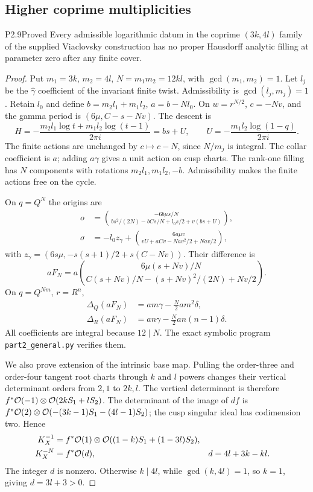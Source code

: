 \subsection{Higher coprime multiplicities}
\begin{statement}{P2.9}{Proved}
Every admissible logarithmic datum in the coprime $(3k,4l)$ family of the supplied Viaclovsky construction has no proper Hausdorff analytic filling at parameter zero after any finite cover.
\end{statement}
\begin{proof}
Put $m_1=3k$, $m_2=4l$, $N=m_1m_2=12kl$, with $\gcd(m_1,m_2)=1$. Let $l_j$ be the $\widehat\gamma$ coefficient of the invariant finite twist. Admissibility is $\gcd(l_j,m_j)=1$. Retain $l_0$ and define $b=m_2l_1+m_1l_2$, $a=b-Nl_0$. On $w=r^{N/2}$, $c=-Nv$, and the gamma period is $(6\mu,C-s-Nv)$. The descent is
\[
 H=-\frac{m_2l_1\log t+m_1l_2\log(t-1)}{2\pi i}=bs+U,
 \qquad U=-\frac{m_1l_2\log(1-q)}{2\pi i}.
\]
The finite actions are unchanged by $c\mapsto c-N$, since $N/m_j$ is integral. The collar coefficient is $a$; adding $a\gamma$ gives a unit action on cusp charts. The rank-one filling has $N$ components with rotations $m_2l_1,m_1l_2,-b$. Admissibility makes the finite actions free on the cycle.

On $q=Q^N$ the origins are
\begin{align*}
 o&=\binom{-6b\mu s/N}{bs^2/(2N)-bCs/N+l_0s/2+v(bs+U)},\\
 \sigma&=-l_0z_\gamma+\binom{6a\mu v}{vU+aCv-Nav^2/2+Nav/2},
\end{align*}
with $z_\gamma=(6s\mu,-s(s+1)/2+s(C-Nv))$. Their difference is
\[
 aF_N=a\binom{6\mu(s+Nv)/N}{C(s+Nv)/N-(s+Nv)^2/(2N)+Nv/2}.
\]
On $q=Q^{Nm}$, $r=R^n$,
\begin{align*}
 \Delta_Q(aF_N)&=am\gamma-\tfrac N2am^2\delta,\\
 \Delta_R(aF_N)&=an\gamma-\tfrac N2an(n-1)\delta.
\end{align*}
All coefficients are integral because $12\mid N$. The exact symbolic program \texttt{part2\_general.py} verifies them.

We also prove extension of the intrinsic base map. Pulling the order-three and order-four tangent root charts through $k$ and $l$ powers changes their vertical determinant orders from $2,1$ to $2k,l$. The vertical determinant is therefore $f^*\mathcal O(-1)\otimes\mathcal O(2kS_1+lS_2)$. The determinant of the image of $df$ is $f^*\mathcal O(2)\otimes\mathcal O(-(3k-1)S_1-(4l-1)S_2)$; the cusp singular ideal has codimension two. Hence
\begin{align*}
 K_X^{-1}&=f^*\mathcal O(1)\otimes\mathcal O((1-k)S_1+(1-3l)S_2),\\
 K_X^{-N}&=f^*\mathcal O(d),& d&=4l+3k-kl.
\end{align*}
The integer $d$ is nonzero. Otherwise $k\mid4l$, while $\gcd(k,4l)=1$, so $k=1$, giving $d=3l+3>0$.


\end{proof}
